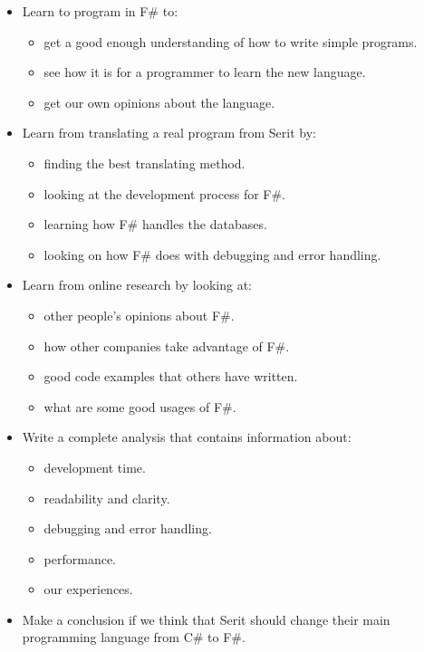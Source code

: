 \documentclass[12pt, a4paper]{article}
\begin{document}
\begin{itemize}

	\item Learn to program in F\# to:
	\begin{itemize}
		\item get a good enough understanding of how to write simple programs.
		\item see how it is for a programmer to learn the new language.
		\item get our own opinions about the language.
	\end{itemize}
	
	\item Learn from translating a real program from Serit by:
	\begin{itemize}
		\item finding the best translating method.
		\item looking at the development process for F\#.
		\item learning how F\# handles the databases.
		\item looking on how F\# does with debugging and error handling.
		
	\end{itemize}
	\item Learn from online research by looking at:
	\begin{itemize}
		\item other people's opinions about F\#.
		\item how other companies take advantage of F\#.
		\item good code examples that others have written.
		\item what are some good usages of F\#.
	\end{itemize}
	
	\item Write a complete analysis that contains information about:
	\begin{itemize}
		\item development time.
		\item readability and clarity.
		\item debugging and error handling.
		\item performance.
		\item our experiences.
	\end{itemize}
	
	\item Make a conclusion if we think that Serit should change their main programming language from C\# to F\#.
	
\end{itemize}
\end{document}
